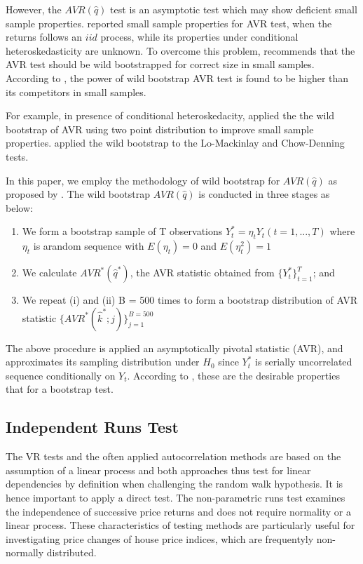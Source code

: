 \documentclass[AEJ,reqno, draftmode]{AEA}
\begin{document}
However, the $AVR(\hat{q})$ test is an asymptotic test which may show deficient small sample properties. \citet{choi1999testing} reported small sample properties for AVR test, when the returns follows an $iid$ process, while its properties under conditional heteroskedasticity are unknown.  To overcome this problem, \citet{kim2009automatic} recommends that the AVR test should be wild bootstrapped for correct size in small samples. According to \citet{kim2009automatic}, the power of wild bootstrap AVR test is found to be higher than its competitors in small samples.

For example, in presence of conditional heteroskedacity, \citet{mammen1993bootstrap} applied the the wild bootstrap of AVR using two point distribution to improve small sample properties. \citet{kim2006wild} applied the wild bootstrap to the Lo-Mackinlay and Chow-Denning tests. 

In this paper, we employ the methodology of wild bootstrap for $AVR(\hat{q})$ as proposed by \citet{kim2009automatic}. The wild bootstrap $AVR(\hat{q})$ is conducted in three stages as below:

\begin{enumerate}[i]
    \item We form a bootstrap sample of T observations $Y^*_t = \eta_t Y_t(t=1,...,T)$ where $\eta_t$ is arandom sequence with $E(\eta_t) = 0$ and $E(\eta_t^2)=1$
    \item We calculate $AVR^*(\hat{q}^*)$, the AVR statistic obtained from $\{Y^*_t\}_{t=1}^T$; and
    \item We repeat (i) and (ii) B = 500 times to form a bootstrap distribution of AVR statistic $\{AVR^*(\hat{k}^*;j)\}_{j=1}^{B=500}$
\end{enumerate}

The above procedure is applied an asymptotically pivotal statistic (AVR), and approximates its sampling distribution under $H_0$ since $Y_t^*$ is serially uncorrelated sequence conditionally on $Y_t$. According to \citet{kim2009automatic}, these are the desirable properties that for a bootstrap test.



\subsection{Independent Runs Test}

The VR tests and the often applied autocorrelation methods are based on the assumption of a linear process and both approaches thus test for linear dependencies by definition when challenging the random walk hypothesis. It is hence important to apply a direct test. The non-parametric runs test examines the independence of successive price returns and does not require normality or a linear process. These characteristics of testing methods are particularly useful for investigating price changes of house price indices, which are frequentyly non-normally distributed.
\end{document}
